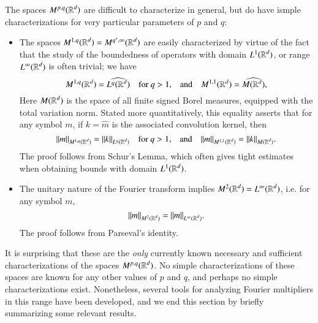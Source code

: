 The spaces $M^{p,q}(\operatorname{\mathbb{R}}^d)$ are difficult to characterize in general, but do have ismple characterizations for very particular parameters of $p$ and $q$:
%
\begin{itemize}
    \item The spaces $M^{1,q}(\operatorname{\mathbb{R}}^d) = M^{q^*,\infty}(\operatorname{\mathbb{R}}^d)$ are easily characterized by virtue of the fact that the study of the boundedness of operators with domain $L^1(\operatorname{\mathbb{R}}^d)$, or range $L^\infty(\operatorname{\mathbb{R}}^d)$ is often trivial; we have
    \[ M^{1,q}(\operatorname{\mathbb{R}}^d) = \widehat{L^q(\operatorname{\mathbb{R}}^d)} \quad\text{for $q > 1$,}\quad \text{and}\quad M^{1,1}(\operatorname{\mathbb{R}}^d) = \widehat{M(\operatorname{\mathbb{R}}^d)}, \]
    Here $M(\operatorname{\mathbb{R}}^d)$ is the space of all finite signed Borel measures, equipped with the total variation norm. Stated more quantitatively, this equality asserts that for any symbol $m$, if $k = \widehat{m}$ is the associated convolution kernel, then
    \[ \| m \|_{M^{1,q}(\operatorname{\mathbb{R}}^d)} = \| k \|_{L^q(\operatorname{\mathbb{R}}^d)}\quad\text{for $q > 1$,}\quad \text{and}\quad \| m \|_{M^{1,1}(\operatorname{\mathbb{R}}^d)} = \| k \|_{M(\operatorname{\mathbb{R}}^d)}. \]
    The proof follows from Schur's Lemma, which often gives tight estimates when obtaining bounds with domain $L^1(\operatorname{\mathbb{R}}^d)$.

    \item The unitary nature of the Fourier transform implies $M^2(\operatorname{\mathbb{R}}^d) = L^\infty(\operatorname{\mathbb{R}}^d)$, i.e. for any symbol $m$,
    \[ \| m \|_{M^2(\operatorname{\mathbb{R}}^d)} = \| m \|_{L^\infty(\operatorname{\mathbb{R}}^d)}. \]
    The proof follows from Parseval's identity.
\end{itemize}
%
It is surprising that these are the \emph{only} currently known necessary and sufficient characterizations of the spaces $M^{p,q}(\operatorname{\mathbb{R}}^d)$. No simple characterizations of these spaces are known for any other values of $p$ and $q$, and perhaps no simple characterizations exist. Nonetheless, several tools for analyzing Fourier multipliers in this range have been developed, and we end this section by briefly summarizing some relevant results.

